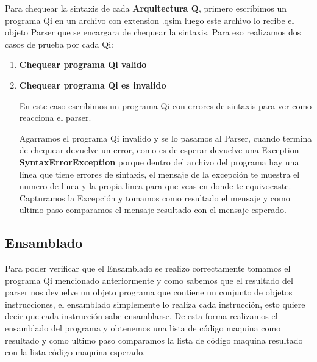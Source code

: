 Para chequear la sintaxis de cada \textbf{Arquitectura Q}, primero escribimos un programa Qi en un archivo con extension .qsim luego este archivo lo recibe el objeto Parser que se encargara de chequear la sintaxis. 
Para eso realizamos dos casos de prueba por cada Qi:
\begin{enumerate}
\item \textbf{Chequear programa Qi valido}



\item \textbf{Chequear programa Qi es invalido} 

En este caso escribimos un programa Qi con errores de sintaxis para ver como reacciona el parser.

Agarramos el programa Qi invalido y se lo pasamos al Parser, cuando termina de chequear devuelve un error, como es de esperar devuelve una Exception \textbf{SyntaxErrorException} porque dentro del archivo del programa hay una linea que tiene errores de sintaxis, el mensaje de la excepción te muestra el numero de linea y la propia linea para que veas en donde te equivocaste. Capturamos la Excepción y tomamos como resultado el mensaje y como ultimo paso comparamos el mensaje resultado con el mensaje esperado.
\end{enumerate}

\subsection{Ensamblado}
Para poder verificar que el Ensamblado se realizo correctamente tomamos el programa Qi mencionado anteriormente y como sabemos que el resultado del parser nos devuelve un objeto programa que contiene un conjunto de objetos instrucciones, el ensamblado simplemente lo realiza cada instrucción, esto quiere decir que cada instrucción sabe ensamblarse. De esta forma realizamos el ensamblado del programa y obtenemos una lista de código maquina como resultado y como ultimo paso comparamos la lista de código maquina resultado con la lista código maquina esperado.

